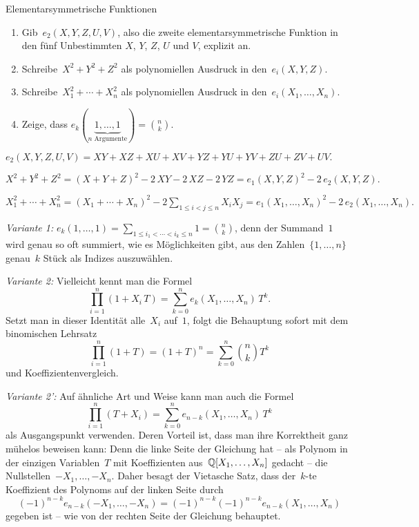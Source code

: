 \documentclass{algblatt}
\begin{document}
\vspace*{-1.5cm}

\begin{aufgabe}{Elementarsymmetrische Funktionen}
\begin{enumerate}
\item Gib~$e_2(X,Y,Z,U,V)$, also
die zweite elementarsymmetrische Funktion in den fünf Unbestimmten
$X$, $Y$, $Z$, $U$ und $V$, explizit an.
\item Schreibe~$X^2 + Y^2 + Z^2$ als polynomiellen Ausdruck in den~$e_i(X,Y,Z)$.
\item Schreibe~$X_1^2 + \cdots + X_n^2$ als polynomiellen Ausdruck in
den~$e_i(X_1,\ldots,X_n)$.
\item Zeige, dass $e_k(\underbrace{1, \dots, 1}_{\text{$n$ Argumente}}) = \binom{n}{k}$.
\end{enumerate}
\begin{loesungE}
\item $e_2(X,Y,Z,U,V) = XY + XZ + XU + XV + YZ + YU + YV + ZU + ZV + UV.$
\item $X^2 + Y^2 + Z^2 = (X + Y + Z)^2 - 2\,XY - 2\,XZ - 2\,YZ =
e_1(X,Y,Z)^2 - 2\,e_2(X,Y,Z).$
\item $X_1^2 + \cdots + X_n^2 = (X_1 + \cdots + X_n)^2 -
2 \sum\limits_{1 \leq i < j \leq n} X_i X_j = e_1(X_1,\ldots,X_n)^2 -
2\,e_2(X_1,\ldots,X_n).$
\item \emph{Variante 1:} $e_k(1,\ldots,1) = \sum_{1 \leq i_1 < \cdots < i_k
\leq n} 1 = \binom{n}{k}$, denn der Summand~$1$ wird genau so oft summiert, wie
es Möglichkeiten gibt, aus den Zahlen~$\{1,\ldots,n\}$ genau~$k$ Stück als
Indizes auszuwählen.

\emph{Variante 2:} Vielleicht kennt man die Formel
\[ \prod_{i=1}^n (1 + X_i\,T) = \sum_{k=0}^n e_k(X_1,\ldots,X_n) \, T^k. \]
Setzt man in dieser Identität alle~$X_i$ auf~$1$, folgt die Behauptung sofort
mit dem binomischen Lehrsatz
\[ \prod_{i=1}^n (1 + T) = (1 + T)^n = \sum_{k=0}^n \binom{n}{k} T^k \]
und Koeffizientenvergleich.

\emph{Variante 2':} Auf ähnliche Art und Weise kann man auch die Formel
\[ \prod_{i=1}^n (T + X_i) = \sum_{k=0}^n e_{n-k}(X_1,\ldots,X_n) \, T^k \]
als Ausgangspunkt verwenden. Deren Vorteil ist, dass man ihre Korrektheit ganz
mühelos beweisen kann: Denn die linke Seite der Gleichung hat -- als Polynom
in der einzigen Variablen~$T$ mit Koeffizienten aus~$\mathbb{Q}[X_1,\ldots,X_n]$
gedacht -- die Nullstellen~$-X_1,\ldots,-X_n$. Daher besagt der Vietasche
Satz, dass der~$k$-te Koeffizient des Polynoms auf der linken Seite durch
\[ (-1)^{n-k} e_{n-k}(-X_1,\ldots,-X_n) = (-1)^{n-k} (-1)^{n-k}
e_{n-k}(X_1,\ldots,X_n) \]
gegeben ist -- wie von der rechten Seite der Gleichung behauptet.


\end{loesungE}
\end{aufgabe}
\end{document}
